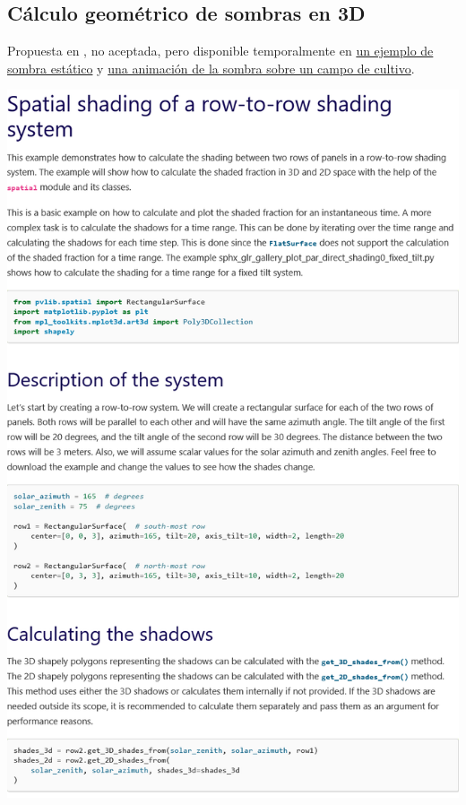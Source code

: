 \begin{myparindent}{0pt}
\newpage\section{Cálculo geométrico de sombras en 3D} \label{sct:doc_ej_sombras_3d}

Propuesta en , no aceptada, pero disponible temporalmente en \href{https://pvlib-python--2106.org.readthedocs.build/en/2106/gallery/shading/plot_spatial_row_to_row_shading.html}{un ejemplo de sombra estático} y \href{https://pvlib-python--2106.org.readthedocs.build/en/2106/gallery/agrivoltaics/plot_par_direct_shading0_fixed_tilt.html}{una animación de la sombra sobre un campo de cultivo}.

\includegraphics[width=\linewidth,height=0.9\textheight,keepaspectratio]{images/docs_examples_cut/shading_row2row_0.png}


\end{myparindent}
